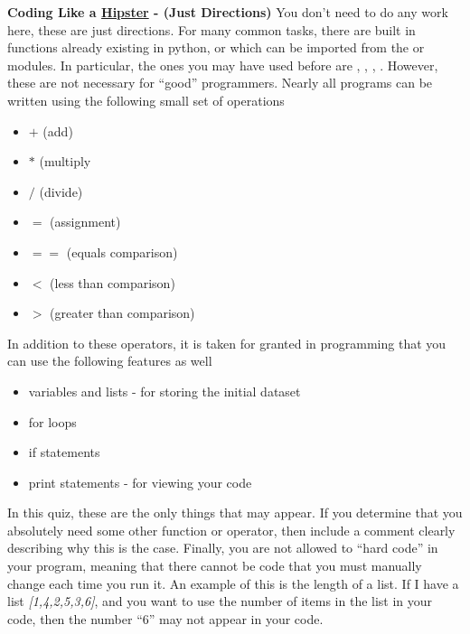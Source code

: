 \documentclass[12pt]{article}
\begin{document}
\textbf{Coding Like a \href{https://www.urbandictionary.com/define.php?term=hipster}{Hipster} - (Just Directions)} 
\newline
You don't need to do any work here, these are just directions.  
\newline
\newline
For many common tasks, there are built in functions already existing in python, or which can be imported from the \small{} or \small{} modules.  In particular, the ones you may have used before are \small{}, \small{}, \small{}, \small{}.  However, these are not necessary for ``good'' programmers.  Nearly all programs can be written using the following small set of operations 
\begin{itemize}[noitemsep]
\item $+$ (add)
\item $*$ (multiply
\item $/$ (divide)
\item $=$ (assignment)
\item $==$ (equals comparison)
\item $<$ (less than comparison)
\item $>$ (greater than comparison)
\end{itemize}
In addition to these operators, it is taken for granted in programming that you can use the following features as well
\begin{itemize}[noitemsep]
\item variables and lists - for storing the initial dataset
\item for loops
\item if statements
\item print statements - for viewing your code
\end{itemize}
In this quiz, these are the only things that may appear.   If you determine that you absolutely need some other function or operator, then include a comment clearly describing why this is the case.
\newline
\newline
Finally, you are not allowed to ``hard code'' in your program, meaning that there cannot be code that you must manually change each time you run it.  An example of this is the length of a list.  If I have a list \textit{[1,4,2,5,3,6]}, and you want to use the number of items in the list in your code, then the number ``6'' may not appear in your code.  
\newline
\newline
\end{document}
